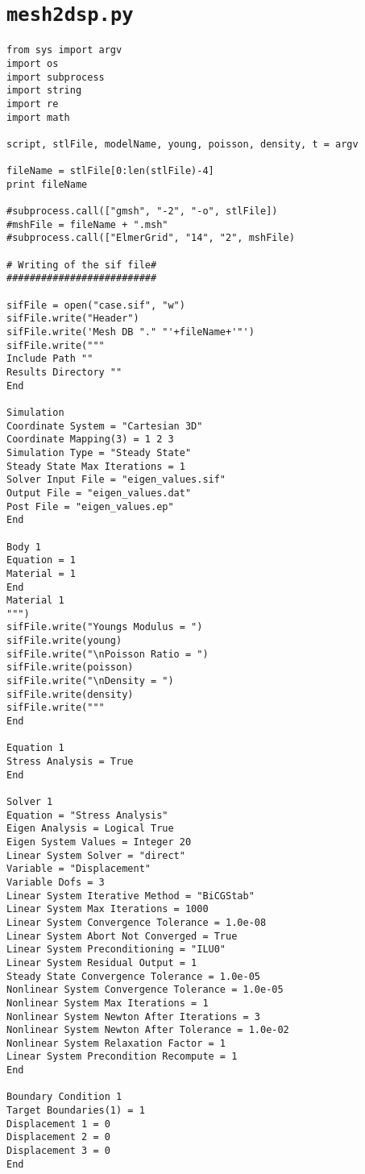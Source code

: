 \chapter{\texttt{mesh2dsp.py}}
\lstset{language=Python}

\begin{lstlisting}
from sys import argv
import os
import subprocess
import string
import re
import math

script, stlFile, modelName, young, poisson, density, t = argv

fileName = stlFile[0:len(stlFile)-4]
print fileName

#subprocess.call(["gmsh", "-2", "-o", stlFile])
#mshFile = fileName + ".msh"
#subprocess.call(["ElmerGrid", "14", "2", mshFile)

# Writing of the sif file#
##########################

sifFile = open("case.sif", "w")
sifFile.write("Header")
sifFile.write('Mesh DB "." "'+fileName+'"')
sifFile.write("""
Include Path ""
Results Directory ""
End

Simulation
Coordinate System = "Cartesian 3D"
Coordinate Mapping(3) = 1 2 3
Simulation Type = "Steady State"
Steady State Max Iterations = 1
Solver Input File = "eigen_values.sif"
Output File = "eigen_values.dat"
Post File = "eigen_values.ep"
End

Body 1
Equation = 1
Material = 1
End
Material 1
""")
sifFile.write("Youngs Modulus = ")
sifFile.write(young)
sifFile.write("\nPoisson Ratio = ")
sifFile.write(poisson)
sifFile.write("\nDensity = ")
sifFile.write(density)
sifFile.write("""
End

Equation 1
Stress Analysis = True
End

Solver 1
Equation = "Stress Analysis"
Eigen Analysis = Logical True
Eigen System Values = Integer 20
Linear System Solver = "direct"
Variable = "Displacement"
Variable Dofs = 3
Linear System Iterative Method = "BiCGStab"
Linear System Max Iterations = 1000
Linear System Convergence Tolerance = 1.0e-08
Linear System Abort Not Converged = True
Linear System Preconditioning = "ILU0"
Linear System Residual Output = 1
Steady State Convergence Tolerance = 1.0e-05
Nonlinear System Convergence Tolerance = 1.0e-05
Nonlinear System Max Iterations = 1
Nonlinear System Newton After Iterations = 3
Nonlinear System Newton After Tolerance = 1.0e-02
Nonlinear System Relaxation Factor = 1
Linear System Precondition Recompute = 1
End

Boundary Condition 1
Target Boundaries(1) = 1
Displacement 1 = 0
Displacement 2 = 0
Displacement 3 = 0
End


\end{lstlisting}
